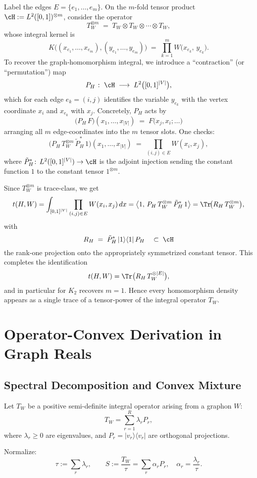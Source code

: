 \documentclass[11pt]{article}
\theoremstyle{definition}
\theoremstyle{plain}
\theoremstyle{remark}
\begin{document}
Label the edges \(E=\{e_1,\dots,e_m\}\).  On the \(m\)-fold tensor product
\(
\cH:=L^2([0,1])^{\otimes m}
\),
consider the operator
\[
T_W^{\otimes m}
\;=\;
T_W\otimes T_W\otimes\cdots\otimes T_W,
\]
whose integral kernel is
\[
K\bigl((x_{e_1},\dots,x_{e_m}),(y_{e_1},\dots,y_{e_m})\bigr)
\;=\;
\prod_{k=1}^mW\bigl(x_{e_k},\,y_{e_k}\bigr).
\]
To recover the graph‑homomorphism integral, we introduce a “contraction” (or “permutation”) map
\[
P_H\;\colon\;\cH\;\longrightarrow\;L^2\bigl([0,1]^{|V|}\bigr),
\]
which for each edge \(e_k=(i,j)\) identifies the variable \(y_{e_k}\) with the vertex coordinate \(x_i\) and \(x_{e_k}\) with \(x_j\).  Concretely, \(P_H\) acts by
\[
\bigl(P_H\,F\bigr)(x_1,\dots,x_{|V|})
\;=\;
F\bigl(x_j,x_i;\dots\bigr)
\]
arranging all \(m\) edge‑coordinates into the \(m\) tensor slots.  One checks:
\[
\bigl(P_H\,T_W^{\otimes m}\,\tilde P_H^*\,1\bigr)(x_1,\dots,x_{|V|})
\;=\;
\prod_{(i,j)\in E}W(x_i,x_j),
\]
where \(\tilde P_H^*\!:\,L^2([0,1]^{|V|})\to\cH\) is the adjoint injection sending the constant function \(1\) to the constant tensor \(1^{\otimes m}\).  

Since \(T_W^{\otimes m}\) is trace‐class, we get
\[
t(H,W)
=\int_{[0,1]^{|V|}}\prod_{(i,j)\in E}W(x_i,x_j)\,dx
=\bigl\langle1,\,
P_H\,T_W^{\otimes m}\,\tilde P_H^*\,1\bigr\rangle
=\Tr\!\bigl(R_H\,T_W^{\otimes m}\bigr),
\]
with
\[
R_H
\;=\;
\tilde P_H^*\,|1\rangle\langle1|\,P_H
\quad\subset\;\cH
\]
the rank‑one projection onto the appropriately symmetrized constant tensor.  This completes the identification
\[
t(H,W)
=\Tr\bigl(R_H\,T_W^{\otimes |E|}\bigr),
\]
and in particular for \(K_2\) recovers \(m=1\).  Hence every homomorphism density appears as a single trace of a tensor‐power of the integral operator \(T_W\).

\section{Operator-Convex Derivation in Graph Reals}

\subsection*{Spectral Decomposition and Convex Mixture}

Let $T_W$ be a positive semi-definite integral operator arising from a graphon $W$:
\[
T_W = \sum_{r=1}^R \lambda_r P_r,
\]
where $\lambda_r \ge 0$ are eigenvalues, and $P_r = |v_r\rangle\langle v_r|$ are orthogonal projections.

Normalize:
\[
\tau := \sum_r \lambda_r, \qquad S := \frac{T_W}{\tau} = \sum_r \alpha_r P_r, \quad \alpha_r = \frac{\lambda_r}{\tau}.
\]
\end{document}
